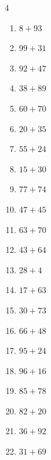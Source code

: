 \begin{multicols}{4}
\begin{enumerate}
  \item $8+93$
        \phantom{$=101$}

  \item $99+31$
        \phantom{$=130$}

  \item $92+47$
        \phantom{$=139$}

  \item $38+89$
        \phantom{$=127$}

  \item $60+70$
        \phantom{$=130$}

  \item $20+35$
        \phantom{$=55$}

  \item $55+24$
        \phantom{$=79$}

  \item $15+30$
        \phantom{$=45$}

  \item $77+74$
        \phantom{$=151$}

  \item $47+45$
        \phantom{$=92$}

  \item $63+70$
        \phantom{$=133$}

  \item $43+64$
        \phantom{$=107$}

  \item $28+4$
        \phantom{$=32$}

  \item $17+63$
        \phantom{$=80$}

  \item $30+73$
        \phantom{$=103$}

  \item $66+48$
        \phantom{$=114$}

  \item $95+24$
        \phantom{$=119$}

  \item $96+16$
        \phantom{$=112$}

  \item $85+78$
        \phantom{$=163$}

  \item $82+20$
        \phantom{$=102$}

  \item $36+92$
        \phantom{$=128$}

  \item $31+69$
        \phantom{$=100$}


\end{enumerate}
\end{multicols}
